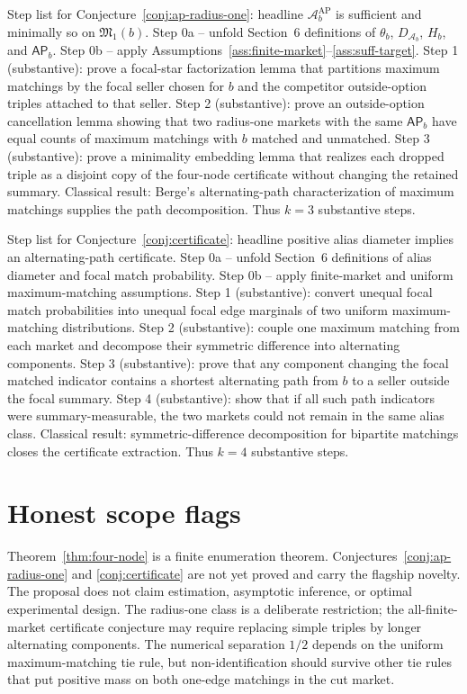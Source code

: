 \documentclass[11pt]{article}
\theoremstyle{definition}
\theoremstyle{plain}
\theoremstyle{remark}
\begin{document}
Step list for Conjecture~\ref{conj:ap-radius-one}: headline \(\mathcal A_b^{\mathrm{AP}}\) is sufficient and minimally so on \(\mathfrak M_1(b)\).  Step 0a -- unfold Section~6 definitions of \(\theta_b\), \(D_{\mathcal A_b}\), \(H_b\), and \(\mathsf{AP}_b\).  Step 0b -- apply Assumptions~\ref{ass:finite-market}--\ref{ass:suff-target}.  Step 1 (substantive): prove a focal-star factorization lemma that partitions maximum matchings by the focal seller chosen for \(b\) and the competitor outside-option triples attached to that seller.  Step 2 (substantive): prove an outside-option cancellation lemma showing that two radius-one markets with the same \(\mathsf{AP}_b\) have equal counts of maximum matchings with \(b\) matched and unmatched.  Step 3 (substantive): prove a minimality embedding lemma that realizes each dropped triple as a disjoint copy of the four-node certificate without changing the retained summary.  Classical result: Berge's alternating-path characterization of maximum matchings supplies the path decomposition.  Thus \(k=3\) substantive steps.

Step list for Conjecture~\ref{conj:certificate}: headline positive alias diameter implies an alternating-path certificate.  Step 0a -- unfold Section~6 definitions of alias diameter and focal match probability.  Step 0b -- apply finite-market and uniform maximum-matching assumptions.  Step 1 (substantive): convert unequal focal match probabilities into unequal focal edge marginals of two uniform maximum-matching distributions.  Step 2 (substantive): couple one maximum matching from each market and decompose their symmetric difference into alternating components.  Step 3 (substantive): prove that any component changing the focal matched indicator contains a shortest alternating path from \(b\) to a seller outside the focal summary.  Step 4 (substantive): show that if all such path indicators were summary-measurable, the two markets could not remain in the same alias class.  Classical result: symmetric-difference decomposition for bipartite matchings closes the certificate extraction.  Thus \(k=4\) substantive steps.

\section{Honest scope flags}
Theorem~\ref{thm:four-node} is a finite enumeration theorem.  Conjectures~\ref{conj:ap-radius-one} and \ref{conj:certificate} are not yet proved and carry the flagship novelty.  The proposal does not claim estimation, asymptotic inference, or optimal experimental design.  The radius-one class is a deliberate restriction; the all-finite-market certificate conjecture may require replacing simple triples by longer alternating components.  The numerical separation \(1/2\) depends on the uniform maximum-matching tie rule, but non-identification should survive other tie rules that put positive mass on both one-edge matchings in the cut market.
\end{document}
